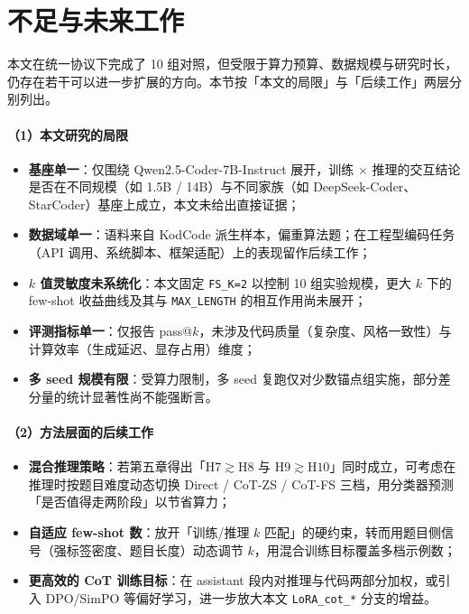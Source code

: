 \section{不足与未来工作}

本文在统一协议下完成了 10 组对照，但受限于算力预算、数据规模与研究时长，仍存在若干可以进一步扩展的方向。本节按「本文的局限」与「后续工作」两层分别列出。

\paragraph{（1）本文研究的局限}
\begin{itemize}
    \item \textbf{基座单一}：仅围绕 Qwen2.5-Coder-7B-Instruct 展开，训练 $\times$ 推理的交互结论是否在不同规模（如 1.5B / 14B）与不同家族（如 DeepSeek-Coder、StarCoder）基座上成立，本文未给出直接证据；
    \item \textbf{数据域单一}：语料来自 KodCode 派生样本，偏重算法题；在工程型编码任务（API 调用、系统脚本、框架适配）上的表现留作后续工作；
    \item \textbf{$k$ 值灵敏度未系统化}：本文固定 \texttt{FS\_K=2} 以控制 10 组实验规模，更大 $k$ 下的 few-shot 收益曲线及其与 \texttt{MAX\_LENGTH} 的相互作用尚未展开；
    \item \textbf{评测指标单一}：仅报告 pass@$k$，未涉及代码质量（复杂度、风格一致性）与计算效率（生成延迟、显存占用）维度；
    \item \textbf{多 seed 规模有限}：受算力限制，多 seed 复跑仅对少数锚点组实施，部分差分量的统计显著性尚不能强断言。
\end{itemize}

\paragraph{（2）方法层面的后续工作}
\begin{itemize}
    \item \textbf{混合推理策略}：若第五章得出「$\mathrm{H7} \gtrsim \mathrm{H8}$ 与 $\mathrm{H9} \gtrsim \mathrm{H10}$」同时成立，可考虑在推理时按题目难度动态切换 Direct / CoT-ZS / CoT-FS 三档，用分类器预测「是否值得走两阶段」以节省算力；
    \item \textbf{自适应 few-shot 数}：放开「训练/推理 $k$ 匹配」的硬约束，转而用题目侧信号（强标签密度、题目长度）动态调节 $k$，用混合训练目标覆盖多档示例数；
    \item \textbf{更高效的 CoT 训练目标}：在 assistant 段内对推理与代码两部分加权，或引入 DPO/SimPO 等偏好学习，进一步放大本文 \texttt{LoRA\_cot\_*} 分支的增益。
\end{itemize}

